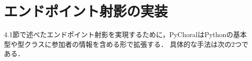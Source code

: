 \documentclass{thesis}
\newcommand{\projection}[2]{{\color{cyan}\llparenthesis}#1{\color{cyan}\rrparenthesis^#2}}
\newcommand{\nl}[1]{{\color{red}{\llbracket}}#1{\color{red}{\rrbracket}}} %
\newcommand{\mg}{~{\color{red}{\sqcup}}~} %
\begin{document}
%
\section{エンドポイント射影の実装}

4.1節で述べたエンドポイント射影を実現するために，PyChoralはPythonの基本型や型クラスに参加者の情報を含める形で拡張する．
具体的な手法は次の2つである．
\end{document}
